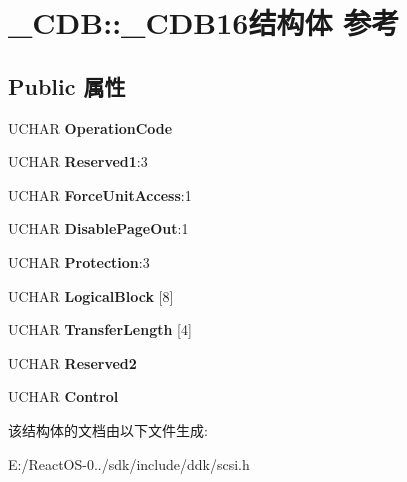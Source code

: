 \hypertarget{struct___c_d_b_1_1___c_d_b16}{}\section{\+\_\+\+C\+DB\+:\+:\+\_\+\+C\+D\+B16结构体 参考}
\label{struct___c_d_b_1_1___c_d_b16}
\subsection*{Public 属性}
\begin{DoxyCompactItemize}
\item 
\mbox{\label{struct___c_d_b_1_1___c_d_b16_ae7cff7c7a3fb399653fa7b2bfc271b50}} 
U\+C\+H\+AR {\bfseries Operation\+Code}
\item 
\mbox{\label{struct___c_d_b_1_1___c_d_b16_a1860c5cafd0dded50fcb48e48ad5ffc3}} 
U\+C\+H\+AR {\bfseries Reserved1}\+:3
\item 
\mbox{\label{struct___c_d_b_1_1___c_d_b16_a5b3a3a7a1e372e607f4caf10539f07cf}} 
U\+C\+H\+AR {\bfseries Force\+Unit\+Access}\+:1
\item 
\mbox{\label{struct___c_d_b_1_1___c_d_b16_a3d1d442bd9b5eb0b86f65bc307b5556d}} 
U\+C\+H\+AR {\bfseries Disable\+Page\+Out}\+:1
\item 
\mbox{\label{struct___c_d_b_1_1___c_d_b16_ab91c3cf18ae3c436e49f3e968e0655f3}} 
U\+C\+H\+AR {\bfseries Protection}\+:3
\item 
\mbox{\label{struct___c_d_b_1_1___c_d_b16_a90a3d6af1dfe1a5af6dc9e11cd271859}} 
U\+C\+H\+AR {\bfseries Logical\+Block} \mbox{[}8\mbox{]}
\item 
\mbox{\label{struct___c_d_b_1_1___c_d_b16_a3a28b15c0a9cff1fadb02ae2eec9a617}} 
U\+C\+H\+AR {\bfseries Transfer\+Length} \mbox{[}4\mbox{]}
\item 
\mbox{\label{struct___c_d_b_1_1___c_d_b16_a8783fce0817684855352e5a7ce101b5f}} 
U\+C\+H\+AR {\bfseries Reserved2}
\item 
\mbox{\label{struct___c_d_b_1_1___c_d_b16_a327d7e2f00cd1bd60b0b306785df220e}} 
U\+C\+H\+AR {\bfseries Control}
\end{DoxyCompactItemize}


该结构体的文档由以下文件生成\+:\begin{DoxyCompactItemize}
\item 
E\+:/\+React\+O\+S-\/0../sdk/include/ddk/scsi.\+h\end{DoxyCompactItemize}
